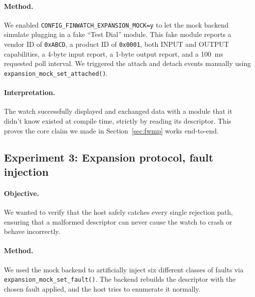 \documentclass[12pt, a4paper]{article}
\begin{document}
\paragraph{Method.} We enabled \texttt{CONFIG\_FINWATCH\_EXPANSION\_MOCK=y} to let the mock backend simulate plugging in a fake ``Test Dial'' module. This fake module reports a vendor ID of \texttt{0xABCD}, a product ID of \texttt{0x0001}, both INPUT and OUTPUT capabilities, a 4-byte input report, a 1-byte output report, and a \SI{100}{\milli\second} requested poll interval. We triggered the attach and detach events manually using \texttt{expansion\_mock\_set\_attached()}.

\paragraph{Interpretation.} The watch successfully displayed and exchanged data with a module that it didn't know existed at compile time, strictly by reading its descriptor. This proves the core claim we made in Section~\ref{sec:fwmp} works end-to-end.

\subsection{Experiment 3: Expansion protocol, fault injection}

\paragraph{Objective.} We wanted to verify that the host safely catches every single rejection path, ensuring that a malformed descriptor can never cause the watch to crash or behave incorrectly.

\paragraph{Method.} We used the mock backend to artificially inject six different classes of faults via \texttt{expansion\_mock\_set\_fault()}. The backend rebuilds the descriptor with the chosen fault applied, and the host tries to enumerate it normally.
\end{document}
